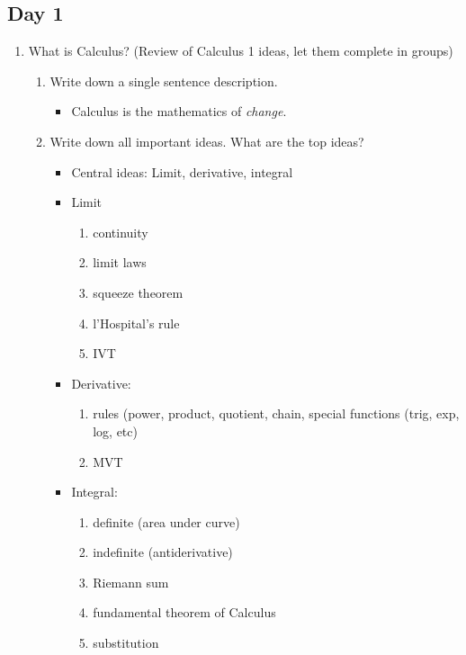 \documentclass{article}
\begin{document}
\subsection{Day 1}

\begin{enumerate}
\item What is Calculus? (Review of Calculus 1 ideas, let them complete in groups) 
\begin{enumerate}

\item Write down a single sentence description.
\begin{itemize}
\item Calculus is the mathematics of \emph{change}.
\end{itemize}

\item Write down all important ideas. What are the top ideas?
\begin{itemize}
\item Central ideas: Limit, derivative, integral
\item Limit
\begin{enumerate}
\item continuity 
\item limit laws 
\item squeeze theorem 
\item l'Hospital's rule
\item IVT
\end{enumerate}
\item Derivative: 
\begin{enumerate}
\item rules (power, product, quotient, chain, special functions (trig, exp, log, etc) 
\item MVT
\end{enumerate}
\item Integral: 
\begin{enumerate}
\item definite (area under curve) 
\item indefinite (antiderivative)
\item Riemann sum
\item fundamental theorem of Calculus
\item substitution
\end{enumerate}
\end{itemize}
\end{enumerate}


\end{enumerate}
\end{document}
